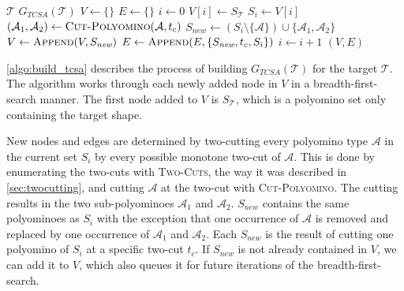 \begin{algorithm}
	\caption{$\text{\scshape Build-TCSA-Graph}$}
	\label{algo:build_tcsa}
	\begin{algorithmic}[1]
		\REQUIRE $\mathcal{T}$ 
		\ENSURE $G_{\textit{TCSA}}(\mathcal{T})$  
		\STATE $V \gets \{\}$
		\STATE $E \gets \{\}$
		\STATE $i \gets 0$
		\STATE $V[i] \gets S_\mathcal{T}$ 
			\STATE $S_i \gets V[i]$
					\STATE $(\mathcal{A}_1, \mathcal{A}_2) \gets \text{\scshape Cut-Polyomino}(\mathcal{A}, t_c)$
					\STATE $S_\textit{new} \gets \left( S_i \setminus \{\mathcal{A}\} \right) \cup \{\mathcal{A}_1, \mathcal{A}_2\}$ 
						\STATE $V \gets \text{\scshape Append}(V, S_\textit{new})$
					\ENDIF
					\STATE $E \gets \text{\scshape Append}(E, \{S_\textit{new}, t_c, S_i\})$
				\ENDFOR
			\ENDFOR
			\STATE $i \gets i+1$
		\ENDWHILE
		\RETURN $(V,E)$
	\end{algorithmic}
\end{algorithm}

\autoref{algo:build_tcsa} describes the process of building $G_{\textit{TCSA}}(\mathcal{T})$ for the target $\mathcal{T}$.
The algorithm works through each newly added node in $V$ in a breadth-first-search manner.
The first node added to $V$ is $S_\mathcal{T}$, which is a polyomino set only containing the target shape.

New nodes and edges are determined by two-cutting every polyomino type $\mathcal{A}$ in the current set $S_i$ by every possible monotone two-cut of $\mathcal{A}$.
This is done by enumerating the two-cuts with {\scshape Two-Cuts}, the way it was described in \autoref{sec:twocutting}, and cutting $\mathcal{A}$ at the two-cut with {\scshape Cut-Polyomino}.
The cutting results in the two sub-polyominoes $\mathcal{A}_1$ and $\mathcal{A}_2$.
$S_\textit{new}$ contains the same polyominoes as $S_i$ with the exception that one occurrence of $\mathcal{A}$ is removed and replaced by one occurrence of $\mathcal{A}_1$ and $\mathcal{A}_2$.
Each $S_\textit{new}$ is the result of cutting one polyomino of $S_i$ at a specific two-cut $t_c$.
If $S_\textit{new}$ is not already contained in $V$, we can add it to $V$, which also queues it for future iterations of the breadth-first-search.

